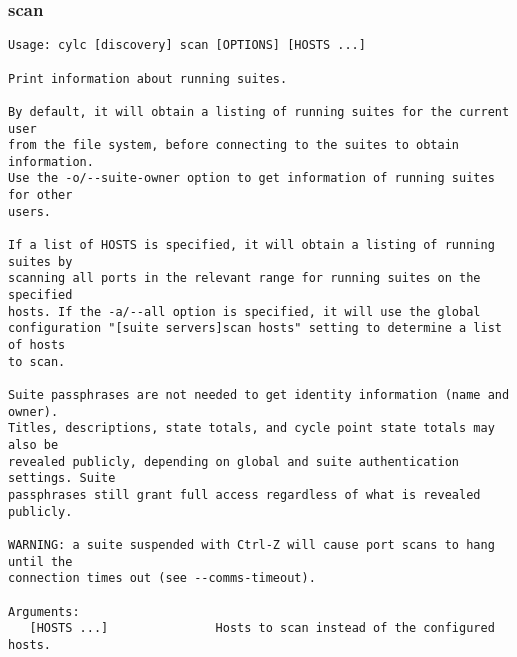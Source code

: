 \subsubsection{scan}
\label{scan}
\begin{lstlisting}
Usage: cylc [discovery] scan [OPTIONS] [HOSTS ...]

Print information about running suites.

By default, it will obtain a listing of running suites for the current user
from the file system, before connecting to the suites to obtain information.
Use the -o/--suite-owner option to get information of running suites for other
users.

If a list of HOSTS is specified, it will obtain a listing of running suites by
scanning all ports in the relevant range for running suites on the specified
hosts. If the -a/--all option is specified, it will use the global
configuration "[suite servers]scan hosts" setting to determine a list of hosts
to scan.

Suite passphrases are not needed to get identity information (name and owner).
Titles, descriptions, state totals, and cycle point state totals may also be
revealed publicly, depending on global and suite authentication settings. Suite
passphrases still grant full access regardless of what is revealed publicly.

WARNING: a suite suspended with Ctrl-Z will cause port scans to hang until the
connection times out (see --comms-timeout).

Arguments:
   [HOSTS ...]               Hosts to scan instead of the configured hosts.


\end{lstlisting}

